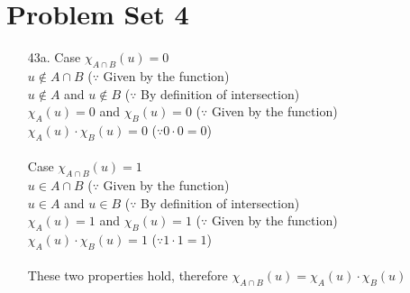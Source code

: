 \documentclass[12pt]{article}
\begin{document}
\section*{Problem Set 4}
\begin{itemize}
    \item [43a.]
        Case $\chi_{A \cap B}(u) = 0$ \\
        $u \notin A \cap B$ \hspace{6em} ($\because$ Given by the function) \\
        $u \notin A$ and $u \notin B$ \hspace{5em} ($\because$ By definition of
            intersection) \\
        $\chi_{A}(u) = 0$ and $\chi_{B}(u) = 0$ \hspace{2em} ($\because$ Given by the
            function) \\
        $\chi_{A}(u) \cdot \chi_{B}(u) = 0$ \hspace{4em} ($\because 0 \cdot 0 = 0$) \\
        \\
        Case $\chi_{A \cap B}(u) = 1$ \\
        $u \in A \cap B$ \hspace{6em} ($\because$ Given by the function) \\
        $u \in A$ and $u \in B$ \hspace{5em} ($\because$ By definition of
            intersection) \\
        $\chi_{A}(u) = 1$ and $\chi_{B}(u) = 1$ \hspace{2em} ($\because$ Given by the
            function) \\
        $\chi_{A}(u) \cdot \chi_{B}(u) = 1$ \hspace{4em} ($\because 1 \cdot 1 = 1$) \\
        \\
        These two properties hold, therefore $\chi_{A \cap B}(u) =
            \chi_{A}(u) \cdot \chi_{B}(u)$


\end{itemize}
\end{document}
